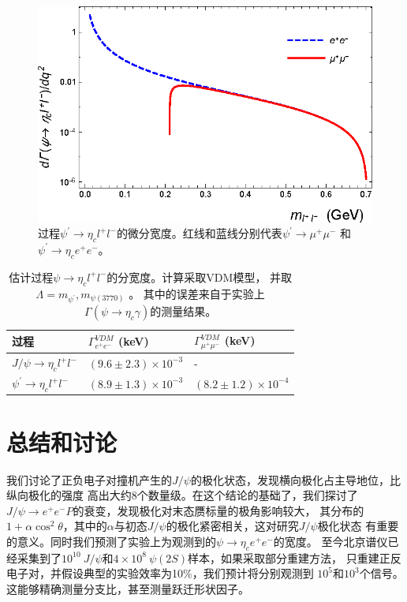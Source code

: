 \begin{figure}[!htbp]
\centering
\includegraphics[width=0.9 \linewidth]{figures/partialW.eps}
\caption{过程$\psi^{\prime} \to \eta_c l^{+} l^{-}$的微分宽度。红线和蓝线分别代表$\psi^{\prime} \to \mu^+ \mu^-$
和$\psi^{\prime} \to \eta_c e^+ e^-$。}%
\label{fig:parW}
\end{figure}

\begin{table}[!htbp]
  \centering
  \caption{估计过程$\psi \to \eta_{c} l^{+} l^{-}$的分宽度。计算采取VDM模型，
    并取$\Lambda = m_{\psi^{\prime}}, m_{\psi(3770)}$ 。
    其中的误差来自于实验上$\Gamma(\psi \to \eta_{c} \gamma)$的测量结果。}%
  \label{tab:VPll}
  \begin{tabular}{p{3.5cm}p{2.5cm}<{\centering}p{2.5cm}<{\centering}}
  \toprule
   过程  &  $\Gamma^{VDM}_{ e^{+}e^{-}}$ (keV)  &  $\Gamma^{VDM}_{ \mu^{+}\mu^{-}}$ (keV) \\
  \midrule
   $J/\psi  \to \eta_{c} l^{+}  l^{-}$  &  $(9.6 \pm 2.3) \times 10^{-3}$   &  -\\
   $\psi^{\prime}  \to \eta_{c} l^{+}  l^{-}$   &  $(8.9 \pm 1.3)  \times 10^{-3}$  &  $(8.2\pm1.2) \times 10^{-4} $    \\
  \bottomrule
  \end{tabular}
\end{table}

\section{总结和讨论}
我们讨论了正负电子对撞机产生的$J/\psi$的极化状态，发现横向极化占主导地位，比纵向极化的强度
高出大约8个数量级。在这个结论的基础了，我们探讨了$J/\psi \to e^{+} e^{-} P$的衰变，发现极化对末态赝标量的极角影响较大，
其分布的$1+\alpha \cos^{2} \theta$，其中的$\alpha$与初态$J/\psi$的极化紧密相关，这对研究$J/\psi$极化状态
有重要的意义。同时我们预测了实验上为观测到的$\psi \to \eta_{c} e^{+} e^{-}$的宽度。
至今北京谱仪已经采集到了$10^{10}~J/\psi$和$4\times 10^{8}~\psi(2S)$样本，如果采取部分重建方法，
只重建正反电子对，并假设典型的实验效率为10\%，我们预计将分别观测到
$10^{5}$和$10^{3}$个信号。这能够精确测量分支比，甚至测量跃迁形状因子。

